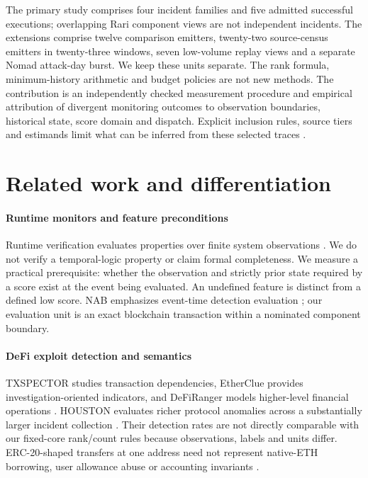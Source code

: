 \documentclass[preprint,12pt,authoryear]{elsarticle}
\begin{document}
The primary study comprises four incident families and five admitted successful executions; overlapping Rari component views are not independent incidents. The extensions comprise twelve comparison emitters, twenty-two source-census emitters in twenty-three windows, seven low-volume replay views and a separate Nomad attack-day burst. We keep these units separate. The rank formula, minimum-history arithmetic and budget policies are not new methods. The contribution is an independently checked measurement procedure and empirical attribution of divergent monitoring outcomes to observation boundaries, historical state, score domain and dispatch. Explicit inclusion rules, source tiers and estimands limit what can be inferred from these selected traces \citep{Kitchenham2004Evidence,Wohlin2012Experimentation}.

\section{Related work and differentiation}\label{sec:related}
\paragraph{Runtime monitors and feature preconditions} Runtime verification evaluates properties over finite system observations \citep{Leucker2009RV,Bauer2011RV}. We do not verify a temporal-logic property or claim formal completeness. We measure a practical prerequisite: whether the observation and strictly prior state required by a score exist at the event being evaluated. An undefined feature is distinct from a defined low score. NAB emphasizes event-time detection evaluation \citep{Lavin2015NAB}; our evaluation unit is an exact blockchain transaction within a nominated component boundary.

\paragraph{DeFi exploit detection and semantics} TXSPECTOR studies transaction dependencies, EtherClue provides investigation-oriented indicators, and DeFiRanger models higher-level financial operations \citep{Zhang2020TxSpector,Aquilina2021EtherClue,Wu2024DeFiRanger}. HOUSTON evaluates richer protocol anomalies across a substantially larger incident collection \citep{Meng2026Houston}. Their detection rates are not directly comparable with our fixed-core rank/count rules because observations, labels and units differ. ERC-20-shaped transfers at one address need not represent native-ETH borrowing, user allowance abuse or accounting invariants \citep{Vogelsteller2015ERC20,Revest2022Postmortem,Rari2022Postmortem}.
\end{document}
